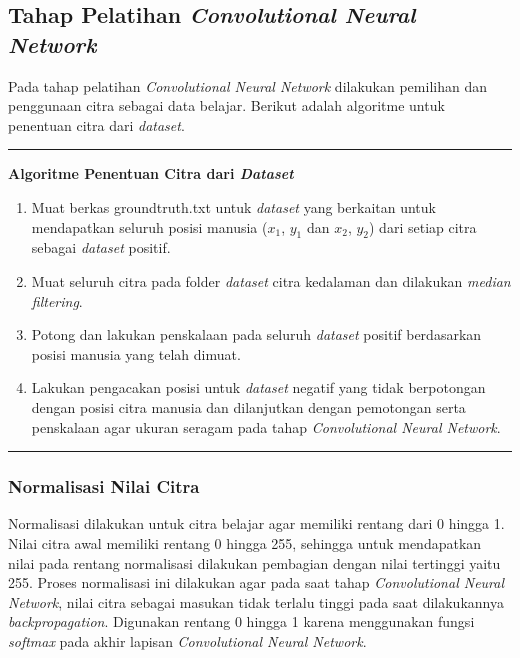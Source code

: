\subsection{Tahap Pelatihan \textit{Convolutional Neural Network}}
\noindent Pada tahap pelatihan \textit{Convolutional Neural Network} dilakukan pemilihan dan penggunaan citra sebagai data belajar. Berikut adalah algoritme untuk penentuan citra dari \textit{dataset}.
\begin{spacing}{1}
\noindent\rule{\textwidth}{1.5pt}
\textbf{Algoritme Penentuan Citra dari \textit{Dataset}}
\begin{enumerate}
\item Muat berkas groundtruth.txt untuk \textit{dataset} yang berkaitan untuk mendapatkan seluruh posisi manusia  ($x_{1}$, $y_{1}$ dan $x_{2}$, $y_{2}$) dari setiap citra sebagai \textit{dataset} positif.
\item Muat seluruh citra pada folder \textit{dataset} citra kedalaman dan dilakukan \textit{median filtering}.
\item Potong dan lakukan penskalaan pada seluruh \textit{dataset} positif berdasarkan posisi manusia yang telah dimuat.
\item Lakukan pengacakan posisi untuk \textit{dataset} negatif yang tidak berpotongan dengan posisi citra manusia dan dilanjutkan dengan pemotongan serta penskalaan agar ukuran seragam pada tahap \textit{Convolutional Neural Network}.
\end{enumerate}
\noindent\rule{\textwidth}{1pt}
\end{spacing}
\subsubsection{Normalisasi Nilai Citra}
\noindent Normalisasi dilakukan untuk citra belajar agar memiliki rentang dari 0 hingga 1. Nilai citra awal memiliki rentang 0 hingga 255, sehingga untuk mendapatkan nilai pada rentang normalisasi dilakukan pembagian dengan nilai tertinggi yaitu 255. Proses normalisasi ini dilakukan agar pada saat tahap \textit{Convolutional Neural Network}, nilai citra sebagai masukan tidak terlalu tinggi pada saat dilakukannya \textit{backpropagation}. Digunakan rentang 0 hingga 1 karena menggunakan fungsi \textit{softmax} pada akhir lapisan \textit{Convolutional Neural Network}.\\

